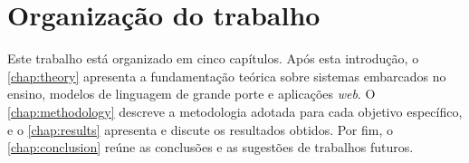 \section{Organização do trabalho}
\label{sec:document-structure}

Este trabalho está organizado em cinco capítulos. Após esta introdução, o \autoref{chap:theory} apresenta a fundamentação teórica sobre sistemas embarcados no ensino, modelos de linguagem de grande porte e aplicações \textit{web}. O \autoref{chap:methodology} descreve a metodologia adotada para cada objetivo específico, e o \autoref{chap:results} apresenta e discute os resultados obtidos. Por fim, o \autoref{chap:conclusion} reúne as conclusões e as sugestões de trabalhos futuros.
